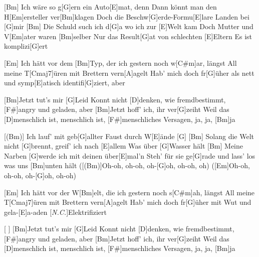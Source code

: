 





\begin{guitar}
	[Bm] Ich wäre so g[G]ern ein Auto[E]mat, denn
	Dann könnt man den H[Em]ersteller ver[Bm]klagen
	Doch die Beschw[G]erde-Formu[E]lare
	Landen bei [G]mir
	[Bm] Die Schuld such ich d[G]a wo ich zur [E]Welt kam
	Doch Mutter und V[Em]ater waren [Bm]selber
	Nur das Result[G]at von schlechten [E]Eltern
	Es ist komplizi[G]ert
	
	[Em] Ich hätt vor dem [Bm]Typ, der ich gestern noch w[C#m]ar, längst
	All meine T[Cmaj7]{ü}ren mit Brettern vern[A]agelt
	Hab' mich doch fr[G]{ü}her als nett und symp[E]atisch identifi[G]ziert, aber
	
	\begin{highlightbar}
		[Bm]Jetzt tut's mir [G]Leid
		Konnt nicht [D]denken, wie fremdbestimmt, [F#]angry und geladen, aber
		[Bm]Jetzt hoff' ich, ihr ver[G]zeiht
		Weil das [D]menschlich ist, menschlich ist, [F#]menschliches Versagen, ja, ja, [Bm]ja
	\end{highlightbar}
	
	\pagebreak
	\songsection{Strophe 2}
	[(Bm)] Ich lauf' mit geb[G]allter Faust durch W[E]{ä}nde [G]{}
	[Bm] Solang die Welt nicht [G]brennt, greif' ich nach [E]allem
	Was über [G]Wasser hält
	[Bm] Meine Narben [G]werde ich mit deinen über[E]mal'n
	Steh' für sie ge[G]rade und lass' los was uns [Bm]unten hält
	([(Bm)]Oh-oh, oh-oh, oh-[G]oh, oh-oh, oh)
	([Em]Oh-oh, oh-oh, oh-[G]oh, oh-oh)
	
	[Em] Ich hätt vor der W[Bm]elt, die ich gestern noch s[C#m]ah, längst
	All meine T[Cmaj7]{ü}ren mit Brettern vern[A]agelt
	Hab' mich doch fr[G]{ü}her mit Wut und gela-[E]a-aden
	[\textit{N.C.}]Elektrifiziert
	
	\begin{highlightbar}
		\songsection{Refrain}
		[ ] [Bm]Jetzt tut's mir [G]Leid
		Konnt nicht [D]denken, wie fremdbestimmt, [F#]angry und geladen, aber
		[Bm]Jetzt hoff' ich, ihr ver[G]zeiht
		Weil das [D]menschlich ist, menschlich ist, [F#]menschliches Versagen, ja, ja, [Bm]ja
	\end{highlightbar}
	

\end{guitar}

